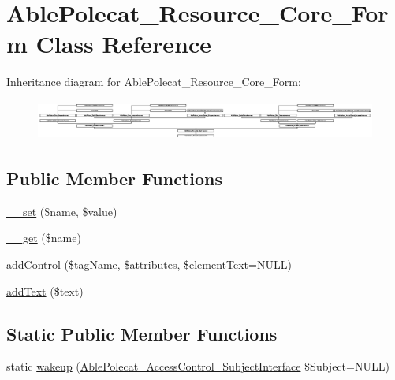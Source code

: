 \hypertarget{class_able_polecat___resource___core___form}{}\section{Able\+Polecat\+\_\+\+Resource\+\_\+\+Core\+\_\+\+Form Class Reference}
\label{class_able_polecat___resource___core___form}
Inheritance diagram for Able\+Polecat\+\_\+\+Resource\+\_\+\+Core\+\_\+\+Form\+:\begin{figure}[H]
\begin{center}
\leavevmode
\includegraphics[height=1.327913cm]{class_able_polecat___resource___core___form}
\end{center}
\end{figure}
\subsection*{Public Member Functions}
\begin{DoxyCompactItemize}
\item 
\hyperlink{class_able_polecat___resource___core___form_a83c2703c91959192f759992ad5640b67}{\+\_\+\+\_\+set} (\$name, \$value)
\item 
\hyperlink{class_able_polecat___resource___core___form_abc8e9e31bb15c8a44c3210ec551407c8}{\+\_\+\+\_\+get} (\$name)
\item 
\hyperlink{class_able_polecat___resource___core___form_a821864ae77be9e52edcdf47d524045c2}{add\+Control} (\$tag\+Name, \$attributes, \$element\+Text=N\+U\+L\+L)
\item 
\hyperlink{class_able_polecat___resource___core___form_acb246776bf97e23ed8ccf1349453bc9b}{add\+Text} (\$text)
\end{DoxyCompactItemize}
\subsection*{Static Public Member Functions}
\begin{DoxyCompactItemize}
\item 
static \hyperlink{class_able_polecat___resource___core___form_a3f2135f6ad45f51d075657f6d20db2cd}{wakeup} (\hyperlink{interface_able_polecat___access_control___subject_interface}{Able\+Polecat\+\_\+\+Access\+Control\+\_\+\+Subject\+Interface} \$Subject=N\+U\+L\+L)
\end{DoxyCompactItemize}
